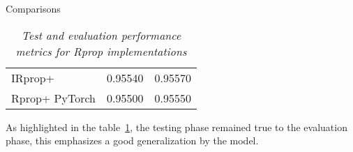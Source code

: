 \begin{section}{Comparisons}
\begin{table}[htp]
\begin{tabular}{|p{4.3cm}|p{4.3cm}|p{4.3cm}|}
            \hspace{1.5cm}IRprop+ \hfill                 & \hspace{1.5cm} 0.95540 \hfill               & \hspace{1.5cm} 0.95570 \hfill                   \\
            \hspace{0.8cm}Rprop+ PyTorch \hfill          & \hspace{1.5cm} 0.95500 \hfill               & \hspace{1.5cm} 0.95550 \hfill              \\
            \hline
        \end{tabular}
        \caption{\emph{Test and evaluation performance metrics for Rprop implementations}}
        \label{tab:test}
    \end{table}
    \par As highlighted in the table~\ref{tab:test}, the testing phase remained true to the evaluation phase, this emphasizes a good generalization by the model.
\end{section}